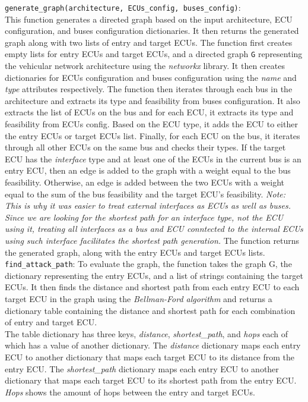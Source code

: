 \texttt{generate\_graph(architecture, ECUs\_config, buses\_config)}:\\
This function generates a directed graph based on the input architecture, ECU configuration, and buses configuration dictionaries. 
It then returns the generated graph along with two lists of entry and target ECUs.
The function first creates empty lists for entry ECUs and target ECUs, and a directed graph \texttt{G} representing 
the vehicular network architecture using the \textit{networkx} library. 
It then creates dictionaries for ECUs configuration and buses configuration using the \textit{name} and \textit{type} attributes respectively.
The function then iterates through each bus in the architecture and extracts its type and feasibility from buses configuration. 
It also extracts the list of ECUs on the bus and for each ECU, it extracts its type and feasibility from ECUs config. 
Based on the ECU type, it adds the ECU to either the entry ECUs or target ECUs list.
Finally, for each ECU on the bus, it iterates through all other ECUs on the same bus and checks their types. 
If the target ECU has the \textit{interface} type and at least one of the ECUs in the current bus is an entry ECU, 
then an edge is added to the graph with a weight equal to the bus feasibility. 
Otherwise, an edge is added between the two ECUs with a weight equal to the sum of the bus feasibility and the target ECU's feasibility.
\textit{Note: This is why it was easier to treat external interfaces as ECUs as well as buses.
Since we are looking for the shortest path for an interface type, not the ECU using it, treating all interfaces
as a bus and ECU conntected to the internal ECUs using such interface facilitates the shortest path generation.}
The function returns the generated graph, along with the entry ECUs and target ECUs lists.\\

\texttt{find\_attack\_path}: To evaluate the graph, the function takes the graph G,
the dictionary representing the entry ECUs, and a list of strings containing the target ECUs. 
It then finds the distance and shortest path from each entry ECU to each target ECU in the graph using the 
\textit{Bellman-Ford algorithm} and returns a dictionary table containing the distance and shortest path for each combination of entry and target ECU.\\
The table dictionary has three keys, \textit{distance}, \textit{shortest\_path}, and \textit{hops} each of which has a value of another dictionary. 
The \textit{distance} dictionary maps each entry ECU to another dictionary that maps each target ECU to its distance from the entry ECU. 
The \textit{shortest\_path} dictionary maps each entry ECU to another dictionary that maps each target ECU to its shortest path from the entry ECU.
\textit{Hops} shows the amount of hops between the entry and target ECUs.\\

